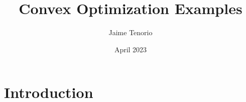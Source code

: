 \documentclass{article}
\title{Convex Optimization Examples}
\author{Jaime Tenorio}
\date{April 2023}
\begin{document}
\maketitle

\section{Introduction}
\end{document}
